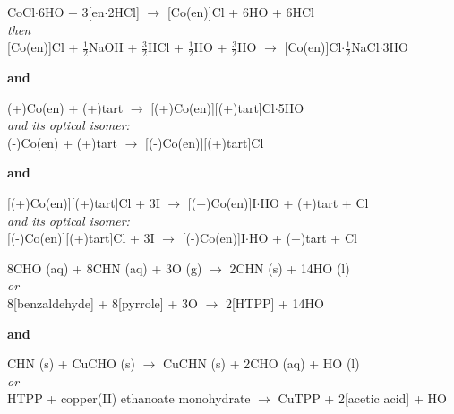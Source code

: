 \begin{center}
  CoCl$\cdot$6HO + 3[en$\cdot$2HCl] $\rightarrow$ [Co(en)]Cl + 6HO + 6HCl \\
    \textit{then} \\

  [Co(en)]Cl + $\frac{1}{2}$NaOH + $\frac{3}{2}$HCl + $\frac{1}{2}$HO + $\frac{3}{2}$HO $\rightarrow$ [Co(en)]Cl$\cdot \frac{1}{2}$NaCl$\cdot$3HO \bigskip

    \textbf{and} \bigskip

  (+)Co(en) + (+)tart $\rightarrow$ [(+)Co(en)][(+)tart]Cl$\cdot$5HO \\
    \textit{and its optical isomer:} \\
  (-)Co(en) + (+)tart $\rightarrow$ [(-)Co(en)][(+)tart]Cl \bigskip

    \textbf{and} \bigskip

  [(+)Co(en)][(+)tart]Cl + 3I\super{-} $\rightarrow$ [(+)Co(en)]I$\cdot$HO + (+)tart + Cl\super{-} \\
    \textit{and its optical isomer:} \\

  [(-)Co(en)][(+)tart]Cl + 3I\super{-} $\rightarrow$ [(-)Co(en)]I$\cdot$HO + (+)tart + Cl\super{-} \\
\end{center}


\begin{center}
  8CHO (aq) + 8CHN (aq) + 3O (g) $\rightarrow$ 2CHN (s) + 14HO (l) \\
    \textit{or} \\
  8[benzaldehyde] + 8[pyrrole] + 3O $\rightarrow$ 2[HTPP] + 14HO \bigskip

    \textbf{and} \bigskip

  CHN (s) + CuCHO (s) $\rightarrow$ CuCHN (s) + 2CHO (aq) + HO (l) \\
    \textit{or} \\
  HTPP + copper(II) ethanoate monohydrate $\rightarrow$ CuTPP + 2[acetic acid] + HO
\end{center}


